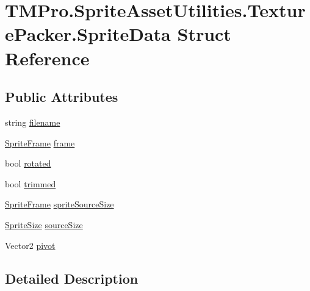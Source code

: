 \hypertarget{struct_t_m_pro_1_1_sprite_asset_utilities_1_1_texture_packer_1_1_sprite_data}{}\section{T\+M\+Pro.\+Sprite\+Asset\+Utilities.\+Texture\+Packer.\+Sprite\+Data Struct Reference}
\label{struct_t_m_pro_1_1_sprite_asset_utilities_1_1_texture_packer_1_1_sprite_data}
\subsection*{Public Attributes}
\begin{DoxyCompactItemize}
\item 
string \mbox{\hyperlink{struct_t_m_pro_1_1_sprite_asset_utilities_1_1_texture_packer_1_1_sprite_data_abe44d4712583603f32510231f847a0df}{filename}}
\item 
\mbox{\hyperlink{struct_t_m_pro_1_1_sprite_asset_utilities_1_1_texture_packer_1_1_sprite_frame}{Sprite\+Frame}} \mbox{\hyperlink{struct_t_m_pro_1_1_sprite_asset_utilities_1_1_texture_packer_1_1_sprite_data_aba51b783405791e2b2b3ef531c9acfc4}{frame}}
\item 
bool \mbox{\hyperlink{struct_t_m_pro_1_1_sprite_asset_utilities_1_1_texture_packer_1_1_sprite_data_af9ff19caaaa8ee148110fa3ab9b190af}{rotated}}
\item 
bool \mbox{\hyperlink{struct_t_m_pro_1_1_sprite_asset_utilities_1_1_texture_packer_1_1_sprite_data_ad116f66559d6d367b914cbd3c1bb2833}{trimmed}}
\item 
\mbox{\hyperlink{struct_t_m_pro_1_1_sprite_asset_utilities_1_1_texture_packer_1_1_sprite_frame}{Sprite\+Frame}} \mbox{\hyperlink{struct_t_m_pro_1_1_sprite_asset_utilities_1_1_texture_packer_1_1_sprite_data_a594b760a42f7cd378fd430afbf7b54dc}{sprite\+Source\+Size}}
\item 
\mbox{\hyperlink{struct_t_m_pro_1_1_sprite_asset_utilities_1_1_texture_packer_1_1_sprite_size}{Sprite\+Size}} \mbox{\hyperlink{struct_t_m_pro_1_1_sprite_asset_utilities_1_1_texture_packer_1_1_sprite_data_a27fec0c459f7cccc253cb136f863e80e}{source\+Size}}
\item 
Vector2 \mbox{\hyperlink{struct_t_m_pro_1_1_sprite_asset_utilities_1_1_texture_packer_1_1_sprite_data_af1d60995dfb106ae0c1ffa3cb5175a37}{pivot}}
\end{DoxyCompactItemize}


\subsection{Detailed Description}


